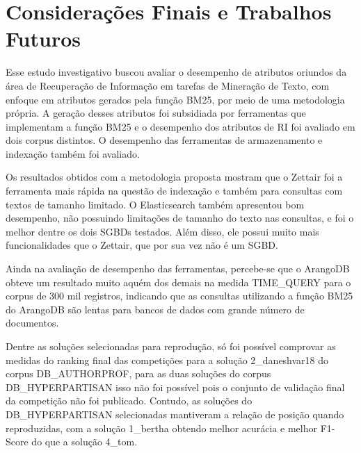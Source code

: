 \chapter{Considerações Finais e Trabalhos Futuros} \label{ch:ConsideraçõesFinais}

Esse estudo investigativo buscou avaliar o desempenho de atributos oriundos da área de Recuperação de Informação em tarefas de Mineração de Texto, com enfoque em atributos gerados pela função BM25, por meio de uma metodologia própria.
A geração desses atributos foi subsidiada por ferramentas que implementam a função BM25 e o desempenho dos atributos de RI foi avaliado em dois corpus distintos.
O desempenho das ferramentas de armazenamento e indexação também foi avaliado.
 
Os resultados obtidos com a metodologia proposta mostram que o Zettair foi a ferramenta mais rápida na questão de indexação e também para consultas com textos de tamanho limitado.
O Elasticsearch também apresentou bom desempenho, não possuindo limitações de tamanho do texto nas consultas, e foi o melhor dentre os dois SGBDs testados.
Além disso, ele possui muito mais funcionalidades que o Zettair, que por sua vez não é um SGBD.

Ainda na avaliação de desempenho das ferramentas, percebe-se que o ArangoDB obteve um resultado muito aquém dos demais na medida TIME\_QUERY para o corpus de 300 mil registros, indicando que as consultas utilizando a função BM25 do ArangoDB são lentas para bancos de dados com grande número de documentos.

Dentre as soluções selecionadas para reprodução, só foi possível comprovar as medidas do ranking final das competições para a solução 2\_daneshvar18 do corpus DB\_AUTHORPROF, para as duas soluções do corpus DB\_HYPERPARTISAN isso não foi possível pois o conjunto de validação final da competição não foi publicado.
Contudo, as soluções do DB\_HYPERPARTISAN selecionadas mantiveram a relação de posição quando reproduzidas, com a solução 1\_bertha obtendo melhor acurácia e melhor F1-Score do que a solução 4\_tom.

